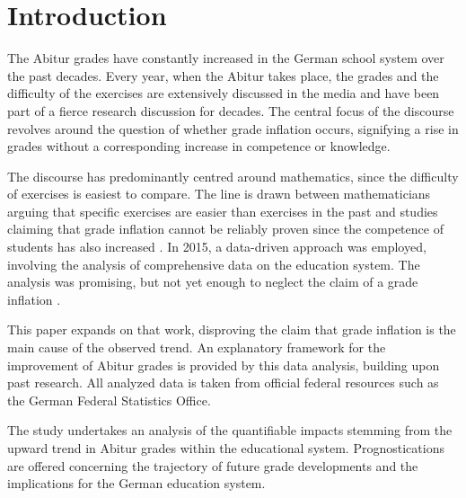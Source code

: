\section{Introduction}
The Abitur grades have constantly increased in the German school system over the past decades. Every year, when the Abitur takes place, the grades and the difficulty of the exercises are extensively discussed in the media and have been part of a fierce research discussion for decades. The central focus of the discourse revolves around the question of whether grade inflation occurs, signifying a rise in grades without a corresponding increase in competence or knowledge.

The discourse has predominantly centred around mathematics, since the difficulty of exercises is easiest to compare. The line is drawn between mathematicians arguing that specific exercises are easier than exercises in the past \cite{kuhnel2015modellierungskompetenz} \cite{JahnkeKleinKühnelSonarSpindler+2014+115+122} \cite{lemmermeyer2019zentralabitur} and studies claiming that grade inflation cannot be reliably proven since the competence of students has also increased \cite{Schleithoff+2015+3+26}.
In 2015, a data-driven approach was employed, involving the analysis of comprehensive data on the education system. The analysis was promising, but not yet enough to neglect the claim of a grade inflation \cite{doi:10.7788/bue-2015-0407}.

This paper expands on that work, disproving the claim that grade inflation is the main cause of the observed trend. An explanatory framework for the improvement of Abitur grades is provided by this data analysis, building upon past research. All analyzed data is taken from official federal resources such as the German Federal Statistics Office.

The study undertakes an analysis of the quantifiable impacts stemming from the upward trend in Abitur grades within the educational system. Prognostications are offered concerning the trajectory of future grade developments and the implications for the German education system.
